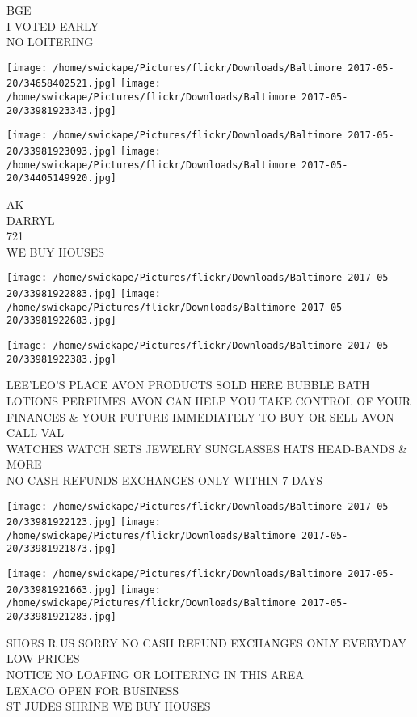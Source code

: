 \documentclass[10pt,letterpaper]{article}
\begin{document}
BGE\\
I VOTED EARLY\\
NO LOITERING
\pagebreak

\texttt{[image: /home/swickape/Pictures/flickr/Downloads/Baltimore 2017-05-20/34658402521.jpg]}
\texttt{[image: /home/swickape/Pictures/flickr/Downloads/Baltimore 2017-05-20/33981923343.jpg]}

\texttt{[image: /home/swickape/Pictures/flickr/Downloads/Baltimore 2017-05-20/33981923093.jpg]}
\texttt{[image: /home/swickape/Pictures/flickr/Downloads/Baltimore 2017-05-20/34405149920.jpg]}

AK\\
DARRYL\\
721\\
WE BUY HOUSES
\pagebreak

\texttt{[image: /home/swickape/Pictures/flickr/Downloads/Baltimore 2017-05-20/33981922883.jpg]}
\texttt{[image: /home/swickape/Pictures/flickr/Downloads/Baltimore 2017-05-20/33981922683.jpg]}

\vspace{0.25in}
\texttt{[image: /home/swickape/Pictures/flickr/Downloads/Baltimore 2017-05-20/33981922383.jpg]}

LEE'LEO'S PLACE AVON PRODUCTS SOLD HERE BUBBLE BATH LOTIONS PERFUMES AVON CAN HELP YOU TAKE CONTROL OF YOUR FINANCES \& YOUR FUTURE IMMEDIATELY TO BUY OR SELL AVON CALL VAL\\
WATCHES WATCH SETS JEWELRY SUNGLASSES HATS HEAD{-}BANDS \& MORE\\
NO CASH REFUNDS EXCHANGES ONLY WITHIN 7 DAYS
\pagebreak

\texttt{[image: /home/swickape/Pictures/flickr/Downloads/Baltimore 2017-05-20/33981922123.jpg]}
\texttt{[image: /home/swickape/Pictures/flickr/Downloads/Baltimore 2017-05-20/33981921873.jpg]}

\texttt{[image: /home/swickape/Pictures/flickr/Downloads/Baltimore 2017-05-20/33981921663.jpg]}
\texttt{[image: /home/swickape/Pictures/flickr/Downloads/Baltimore 2017-05-20/33981921283.jpg]}

SHOES R US SORRY NO CASH REFUND EXCHANGES ONLY EVERYDAY LOW PRICES\\
NOTICE NO LOAFING OR LOITERING IN THIS AREA\\
LEXACO OPEN FOR BUSINESS\\
ST JUDES SHRINE WE BUY HOUSES
\pagebreak
\end{document}
